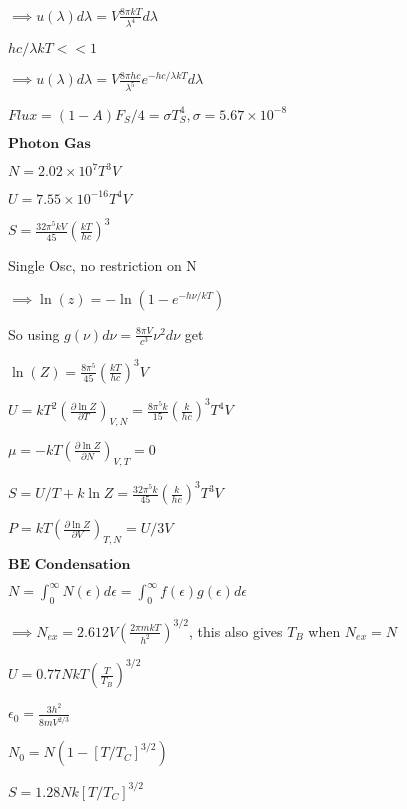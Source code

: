 \documentclass{article}
\begin{document}
\begin{multicols}{3}
$\implies u(\lambda)d\lambda=V\frac{8\pi kT}{\lambda^4}d\lambda$

$hc/\lambda kT << 1$

$\implies u(\lambda)d\lambda=V\frac{8\pi hc}{\lambda^5}e^{-hc/\lambda kT}d\lambda$

$Flux=(1-A)F_S/4=\sigma T_S^4, \sigma=5.67\times 10^{-8}$

$\textbf{Photon Gas}$

$N=2.02\times 10^7 T^3 V$

$U=7.55\times 10^{-16}T^4V$

$S=\frac{32\pi^5 kV}{45}\left ( \frac{kT}{hc} \right ) ^3$

Single Osc, no restriction on N

$\implies \ln(z)=-\ln(1-e^{-h\nu / kT})$

So using $g(\nu)d\nu=\frac{8\pi V}{c^3}\nu^2 d\nu$ get

$\ln(Z)=\frac{8\pi^5}{45} \left ( \frac{kT}{hc} \right )^3 V$

$U=kT^2 \left( \frac{\partial \ln Z}{\partial T} \right)_{V,N}=\frac{8 \pi^5 k}{15}\left(\frac{k}{hc}\right)^3 T^4 V$

$\mu=-kT \left( \frac{\partial \ln Z}{\partial N} \right)_{V,T}=0$

$S=U/T+k \ln Z=\frac{32 \pi^5 k}{45}\left(\frac{k}{hc}\right)^3 T^3 V$

$P=kT \left( \frac{\partial \ln Z}{\partial V} \right)_{T,N}=U/3V$

$\textbf{BE Condensation}$

$N=\int_0^\infty N(\epsilon)d\epsilon = \int_0^\infty f(\epsilon)g(\epsilon)d\epsilon$

$\implies N_{ex}=2.612 V \left ( \frac{2\pi mkT}{h^2} \right )^{3/2}$, this also gives $T_B$ when $N_{ex}=N$

$U=0.77 NkT \left ( \frac{T}{T_B}  \right )^{3/2}$

$\epsilon_0=\frac{3h^2}{8mV^{2/3}}$

$N_0=N(1-[T/T_C]^{3/2})$

$S=1.28Nk[T/T_C]^{3/2}$

\end{multicols}
\end{document}
